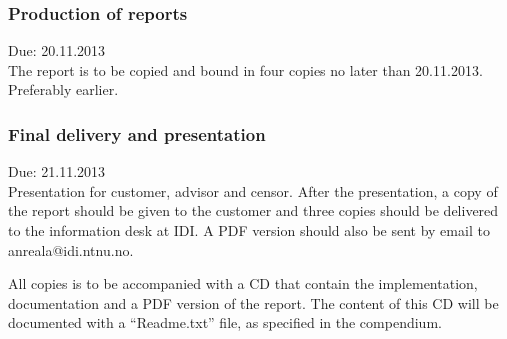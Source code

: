 \documentclass[11pt]{book}
\begin{document}
\subsubsection{Production of reports}
Due: 20.11.2013\\
The report is to be copied and bound in four copies no later than 20.11.2013. Preferably earlier.

\subsubsection{Final delivery and presentation}
Due: 21.11.2013\\
Presentation for customer, advisor and censor. After the presentation, a copy of the report should be given to the customer and three copies should be delivered to the information desk at IDI. A PDF version should also be sent by email to anreala@idi.ntnu.no.

All copies is to be accompanied with a CD that contain the implementation, documentation and a PDF version of the report. The content of this CD will be documented with a ``Readme.txt'' file, as specified in the compendium.
\end{document}
